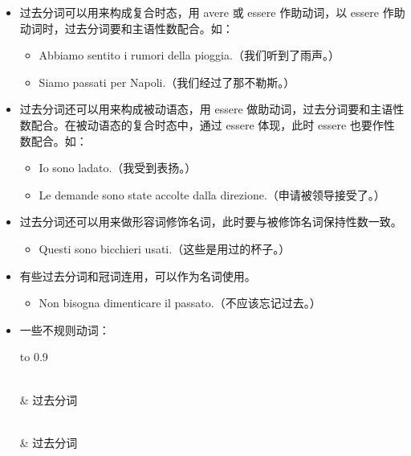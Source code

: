 \documentclass[UTF8,a4paper,titlepage,10pt]{report}
\begin{document}
\begin{enumerate}
\begin{itemize}
\item 过去分词可以用来构成复合时态，用 avere 或 essere 作助动词，以 essere 作助动词时，过去分词要和主语性数配合。如：
\begin{itemize}
\item Abbiamo sentito i rumori della pioggia.（我们听到了雨声。）
\item Siamo passati per Napoli.（我们经过了那不勒斯。）
\end{itemize}
\item 过去分词还可以用来构成被动语态，用 essere 做助动词，过去分词要和主语性数配合。在被动语态的复合时态中，通过 essere 体现，此时 essere 也要作性数配合。如：
\begin{itemize}
\item Io sono ladato.（我受到表扬。）
\item Le demande sono state accolte dalla direzione.（申请被领导接受了。）
\end{itemize}
\item 过去分词还可以用来做形容词修饰名词，此时要与被修饰名词保持性数一致。
\begin{itemize}
\item Questi sono bicchieri usati.（这些是用过的杯子。）
\end{itemize}
\item 有些过去分词和冠词连用，可以作为名词使用。
\begin{itemize}
\item Non bisogna dimenticare il passato.（不应该忘记过去。）
\end{itemize}
\item 一些不规则动词：
\begin{longtabu} to 0.9\textwidth {l|X}
\caption{意大利语过去分词不规则动词变位表}
\\[0pt]
\toprule
 & 过去分词\\[0pt]
\midrule
\endfirsthead
{} \\[0pt]
\toprule

 & 过去分词 \\[0pt]


\end{longtabu}
\end{itemize}
\end{enumerate}
\end{document}
